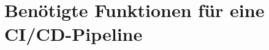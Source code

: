 \section{Benötigte Funktionen für eine CI/CD-Pipeline}
\label{Benoetigte Funktionen für eine CI/CD-Pipeline}